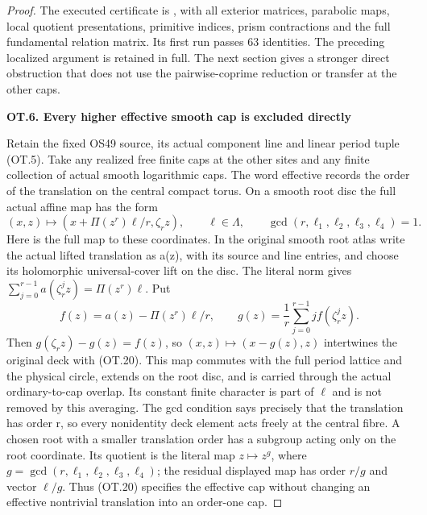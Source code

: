 \begin{proof}
The executed certificate is , with all
exterior matrices, parabolic maps, local quotient presentations, primitive
indices, prism contractions and the full fundamental relation matrix.
Its first run passes 63 identities. The preceding localized argument is
retained in full. The next section gives a stronger direct obstruction
that does not use the pairwise-coprime reduction or transfer at the other
caps.

\par

\medskip\noindent\textbf{OT.6. Every higher effective smooth cap is excluded directly}

\par\nobreak

Retain the fixed OS49 source, its actual component line and linear
period tuple (OT.5). Take any realized free finite caps at the other
sites and any finite collection of actual smooth logarithmic caps. The
word effective records the order of the translation on the central
compact torus. On a smooth root disc the full actual affine map has the
form
\[
 (x,z)\longmapsto(x+\Pi(z^r)\ell/r,\zeta_r z),
 \qquad \ell\in\Lambda,\qquad
       \gcd(r,\ell_1,\ell_2,\ell_3,\ell_4)=1.          \tag{OT.20}
\]
Here is the full map to these coordinates. In the original smooth root
atlas write the actual lifted translation as a(z), with its source and
line entries, and choose its holomorphic universal-cover lift on the
disc. The literal norm gives
\(\sum_{j=0}^{r-1}a(\zeta_r^jz)=\Pi(z^r)\ell\). Put
\[
 f(z)=a(z)-\Pi(z^r)\ell/r,\qquad
 g(z)=\frac1r\sum_{j=0}^{r-1}j f(\zeta_r^j z).
                                                               \tag{OT.20a}
\]
Then \(g(\zeta_rz)-g(z)=f(z)\), so \((x,z)\mapsto(x-g(z),z)\)
intertwines the original deck with (OT.20). This map commutes with the
full period lattice and the physical circle, extends on the root disc,
and is carried through the actual ordinary-to-cap overlap. Its constant
finite character is part of \(\ell\) and is not removed by this averaging.
The gcd condition says precisely that
the translation has order r, so every nonidentity deck element acts
freely at the central fibre. A chosen root with a smaller translation
order has a subgroup acting only on the root coordinate. Its quotient
is the literal map \(z\mapsto z^g\), where
\(g=\gcd(r,\ell_1,\ell_2,\ell_3,\ell_4)\); the residual displayed map has order
\(r/g\) and vector \(\ell/g\). Thus (OT.20) specifies the effective cap without
changing an effective nontrivial translation into an order-one cap.


\end{proof}
